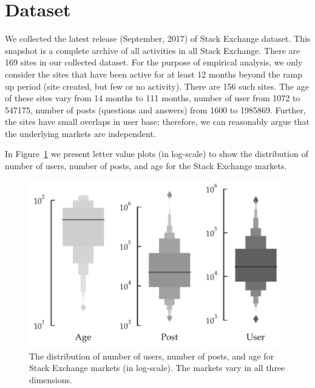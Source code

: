 \section{Dataset} 
We collected the latest release (September, 2017) of Stack Exchange dataset. This snapshot is a complete archive of all activities in all Stack Exchange. There are 169 sites in our collected dataset. For the purpose of empirical analysis, we only consider the sites that have been active for at least 12 months beyond the ramp up period (site created, but few or no activity). There are 156 such sites. The age of these sites vary from 14 months to 111 months, number of user from 1072 to 547175, number of posts (questions and answers) from 1600 to 1985869. Further, the sites have small overlaps in user base; therefore, we can reasonably argue that the underlying markets are independent. 

In Figure~\ref{fig:dataset} we present letter value plots (in log-scale) to show the distribution of number of users, number of posts, and age for the Stack Exchange markets. 

\begin{figure}[hbt]
\vspace{-\baselineskip}
\centering
\includegraphics[scale=0.45]{Figures/Dataset_Statistics.pdf}
\vspace{-\baselineskip}
\caption{The distribution of number of users, number of posts, and age for Stack Exchange markets (in log-scale). The markets vary in all three dimensions.}
\vspace{-\baselineskip}
\label{fig:dataset}
\end{figure}
